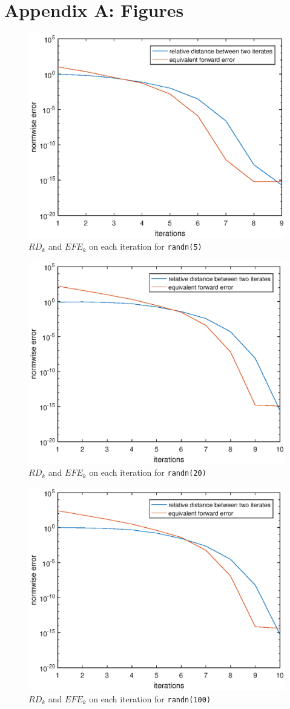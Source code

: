\documentclass[12pt]{article}
\def\t#1{\texttt{\upshape #1}}
\begin{document}

{}
\appendix
\clearpage
\section*{Appendix A: Figures}

\begin{figure}[h]
	\centering
	\caption{$RD_k$ and $EFE_k$ on each iteration for \t{randn(5)}}
	\includegraphics[width=.67\textwidth]{randn5.eps}
\end{figure}


\begin{figure}[h]
	\centering
	\caption{$RD_k$ and $EFE_k$ on each iteration for \t{randn(20)}}
	\includegraphics[width=.67\textwidth]{randn20.eps}
\end{figure}

\begin{figure}[h]
	\centering
	\caption{$RD_k$ and $EFE_k$ on each iteration for \t{randn(100)}}
	\includegraphics[width=.7\textwidth]{randn100.eps}
\end{figure}
\end{document}
